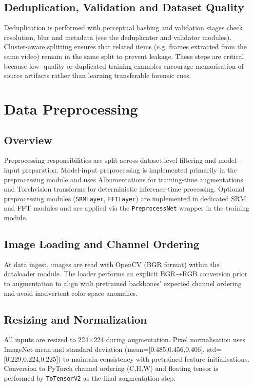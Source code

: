 \documentclass[11pt]{report}
\begin{document}
\subsection{Deduplication, Validation and Dataset Quality}
Deduplication is performed with perceptual hashing and validation stages check
resolution, blur and metadata (see the deduplicator and validator modules).
Cluster-aware splitting ensures that related items (e.g. frames extracted from the same video) remain
in the same split to prevent leakage. These steps are critical because low-
quality or duplicated training examples encourage memorisation of source
artifacts rather than learning transferable forensic cues.

\section{Data Preprocessing}
\subsection{Overview}
Preprocessing responsibilities are split across dataset-level filtering and
model-input preparation. Model-input preprocessing is implemented primarily in
the preprocessing module and uses Albumentations for training-time
augmentations and Torchvision transforms for deterministic inference-time
processing. Optional preprocessing modules (\texttt{SRMLayer}, \texttt{FFTLayer})
are implemented in dedicated SRM and FFT modules and are applied via the
\texttt{PreprocessNet} wrapper in the training module.

\subsection{Image Loading and Channel Ordering}
At data ingest, images are read with OpenCV (BGR format) within the dataloader
module. The loader performs an explicit BGR→RGB conversion prior to
augmentation to align with pretrained backbones' expected channel ordering and
avoid inadvertent color-space anomalies.

\subsection{Resizing and Normalization}
All inputs are resized to 224×224 during augmentation. Pixel normalisation uses
ImageNet mean and standard deviation (mean=[0.485,0.456,0.406],
std=[0.229,0.224,0.225]) to maintain consistency with pretrained feature
initialisations. Conversion to PyTorch channel ordering (C,H,W) and floating
tensor is performed by \texttt{ToTensorV2} as the final augmentation step.
\end{document}
